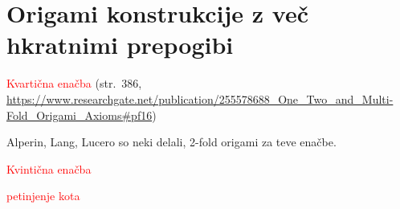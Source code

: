 \section{Origami konstrukcije z več hkratnimi prepogibi}
\label{pogl:multifold}

\textcolor{red}{Kvartična enačba} (str.\ 386, \url{https://www.researchgate.net/publication/255578688_One_Two_and_Multi-Fold_Origami_Axioms#pf16})

Alperin, Lang, Lucero so neki delali, 2-fold origami za teve enačbe.

\textcolor{red}{Kvintična enačba}

\textcolor{red}{petinjenje kota}
